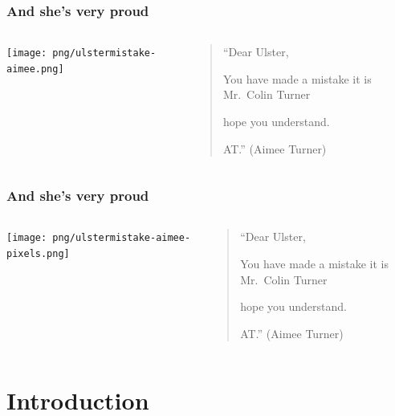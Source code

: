 \documentclass{beamer}
\begin{document}
{
\begin{frame}
  \frametitle{And she's very proud}

  \begin{columns}
  \column{6 cm}
  \texttt{[image: png/ulstermistake-aimee.png]}
 
  \column{6 cm}
  \begin{center}
  \begin{quote}
  ``Dear Ulster,
  
  You have made a mistake it is Mr.\ Colin Turner
  
  hope you understand.
  
  AT.''
  (Aimee Turner)
  \end{quote}
  \end{center}

  \end{columns}
\end{frame}


\begin{frame}
  \frametitle{And she's very proud}

  \begin{columns}
  \column{6 cm}
  \texttt{[image: png/ulstermistake-aimee-pixels.png]}
  
  \column{6 cm}
  \begin{center}
  \begin{quote}
  ``Dear Ulster,
  
  You have made a mistake it is Mr.\ Colin Turner
  
  hope you understand.
  
  AT.''
  (Aimee Turner)
  \end{quote}
  \end{center}
  \end{columns}
\end{frame}
}


\section{Introduction}
\end{document}
